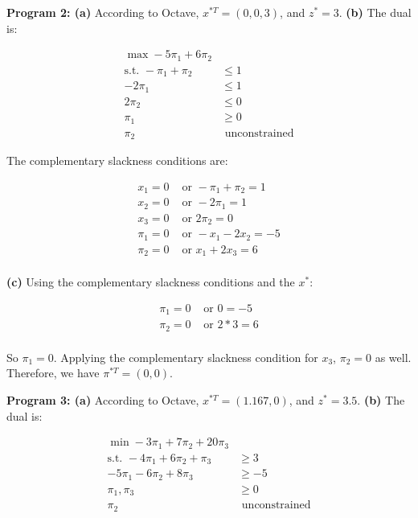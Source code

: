 \documentclass[fleqn]{homework}
\begin{document}
\begin{problem}{2}
    \textbf{Program 2: (a)} According to Octave, $x^{*T} = (0, 0, 3)$, and
    $z^* = 3$.  \textbf{(b)} The dual is:

    \begin{align*}
      \max -5\pi_1 + 6\pi_2 &\\
      \text{s.t. } -\pi_1 + \pi_2 &\le 1 \\
      -2\pi_1 &\le 1 \\
      2\pi_2 &\le 0 \\
      \pi_1 &\ge 0 \\
      \pi_2 &\text{ unconstrained}
    \end{align*}

    The complementary slackness conditions are:

    \begin{align*}
      x_1 = 0 &\text{ or } -\pi_1 + \pi_2 = 1 \\
      x_2 = 0 &\text{ or } -2\pi_1 = 1 \\
      x_3 = 0 &\text{ or } 2\pi_2 = 0 \\
      \pi_1 = 0 &\text{ or } -x_1 - 2x_2 = -5 \\
      \pi_2 = 0 &\text{ or } x_1 + 2x_3 = 6 \\
    \end{align*}

    \textbf{(c)} Using the complementary slackness conditions and the $x^*$:

    \begin{align*}
      \pi_1 = 0 &\text{ or } 0 = -5 \\
      \pi_2 = 0 &\text{ or } 2*3 = 6 \\      
    \end{align*}

    So $\pi_1 = 0$.  Applying the complementary slackness condition for $x_3$,
    $\pi_2 = 0$ as well.  Therefore, we have $\pi^{*T} = (0, 0)$.

    \textbf{Program 3: (a)} According to Octave, $x^{*T} = (1.167, 0)$, and
    $z^* = 3.5$.  \textbf{(b)} The dual is:

    \begin{align*}
      \min -3 \pi_1 + 7 \pi_2 + 20 \pi_3 &\\
      \text{s.t. } -4\pi_1 + 6\pi_2 + \pi_3 &\ge 3 \\
      -5\pi_1 - 6\pi_2 + 8\pi_3 &\ge -5 \\
      \pi_1, \pi_3 &\ge 0 \\
      \pi_2 &\text{ unconstrained}
    \end{align*}


\end{problem}
\end{document}
